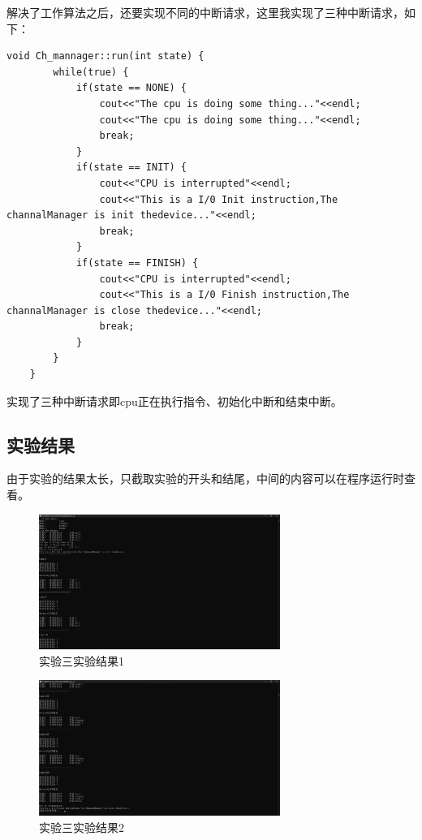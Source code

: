 \documentclass[UTF8,12pt]{article}
\begin{document}
解决了工作算法之后，还要实现不同的中断请求，这里我实现了三种中断请求，如下：

\begin{lstlisting}[frame=shadowbox] 
    void Ch_mannager::run(int state) {
        while(true) {
            if(state == NONE) {
                cout<<"The cpu is doing some thing..."<<endl;
                cout<<"The cpu is doing some thing..."<<endl;
                break;
            }
            if(state == INIT) {
                cout<<"CPU is interrupted"<<endl;
                cout<<"This is a I/0 Init instruction,The channalManager is init thedevice..."<<endl;
                break;
            }
            if(state == FINISH) {
                cout<<"CPU is interrupted"<<endl;
                cout<<"This is a I/0 Finish instruction,The channalManager is close thedevice..."<<endl;
                break;
            }
        }
    }
\end{lstlisting}

实现了三种中断请求即cpu正在执行指令、初始化中断和结束中断。

\newpage

\subsection{实验结果}
由于实验的结果太长，只截取实验的开头和结尾，中间的内容可以在程序运行时查看。

\begin{figure}[htbp]
    \centering
    \includegraphics[width=0.7\textwidth]{imgs/7.png}
    \caption{实验三实验结果1}
\end{figure}

\begin{figure}[htbp]
    \centering
    \includegraphics[width=0.7\textwidth]{imgs/8.png}
    \caption{实验三实验结果2}
\end{figure}
\end{document}
